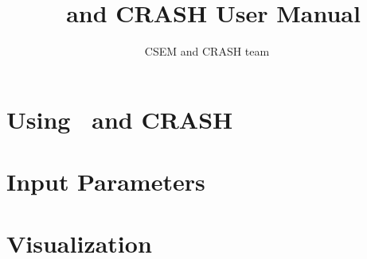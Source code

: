 \documentclass[twoside,10pt]{book}
\title{\BATSRUS\ and CRASH User Manual}
\author{CSEM and CRASH team}
\begin{document}
\pagestyle{headings}

\maketitle

\tableofcontents



\chapter{Using \BATSRUS\ and CRASH \label{chapter:usage}}





\chapter{Input Parameters \label{chapter:param}}






\chapter{Visualization \label{chapter:visualization}}




%
\end{document}
